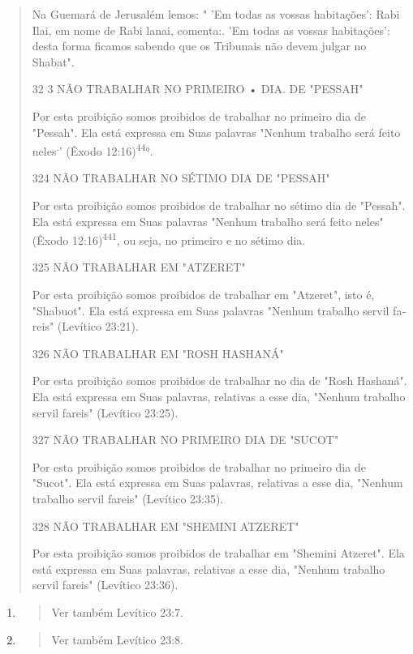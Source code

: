\begin{quote}
Na Guemará de Jerusalém lemos: " 'Em todas as vossas habitações': Rabi
Ilai, em nome de Rabi lanai, comenta:. 'Em todas as vossas habitações':
desta forma ficamos sabendo que os Tribunais não devem julgar no
Shabat".

32 3 NÃO TRABALHAR NO PRIMEIRO • DIA. DE "PESSAH"

Por esta proibição somos proibidos de trabalhar no primeiro dia de
"Pessah". Ela está expressa em Suas palavras "Nenhum trabalho será feito
ne­les\textsuperscript{.}' (Êxodo 12:16)\textsuperscript{44}°.

324 NÃO TRABALHAR NO SÉTIMO DIA DE "PESSAH"

Por esta proibição somos proibidos de trabalhar no sétimo dia de
"Pessah". Ela está expressa em Suas palavras "Nenhum trabalho será feito
ne­les" (Êxodo 12:16)\textsuperscript{441}, ou seja, no primeiro e no
sétimo dia.

325 NÃO TRABALHAR EM "ATZERET"

Por esta proibição somos proibidos de trabalhar em "Atzeret", isto é,
"Shabuot". Ela está expressa em Suas palavras "Nenhum trabalho servil
fa­reis" (Levítico 23:21).

326 NÃO TRABALHAR EM "ROSH HASHANÁ"

Por esta proibição somos proibidos de trabalhar no dia de "Rosh
Has­haná". Ela está expressa em Suas palavras, relativas a esse dia,
"Nenhum traba­lho servil fareis" (Levítico 23:25).

327 NÃO TRABALHAR NO PRIMEIRO DIA DE "SUCOT"

Por esta proibição somos proibidos de trabalhar no primeiro dia de
"Sucot". Ela está expressa em Suas palavras, relativas a esse dia,
"Nenhum tra­balho servil fareis" (Levítico 23:35).

328 NÃO TRABALHAR EM "SHEMINI ATZERET"

Por esta proibição somos proibidos de trabalhar em "Shemini Atze­ret".
Ela está expressa em Suas palavras, relativas a esse dia, "Nenhum
trabalho servil fareis" (Levítico 23:36).
\end{quote}

\begin{enumerate}
\def\labelenumi{\arabic{enumi}.}
\setcounter{enumi}{439}
\item
  \begin{quote}
  Ver também Levítico 23:7.
  \end{quote}
\item
  \begin{quote}
  Ver também Levítico 23:8.
  \end{quote}
\end{enumerate}

